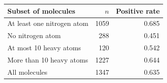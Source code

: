 \begin{tabular}{lrr}
\toprule
Subset of molecules & $n$ & Positive rate \\
\midrule
At least one nitrogen atom & 1059 & 0.685 \\
No nitrogen atom & 288 & 0.451 \\
At most 10 heavy atoms & 120 & 0.542 \\
More than 10 heavy atoms & 1227 & 0.644 \\
All molecules & 1347 & 0.635 \\
\bottomrule
\end{tabular}